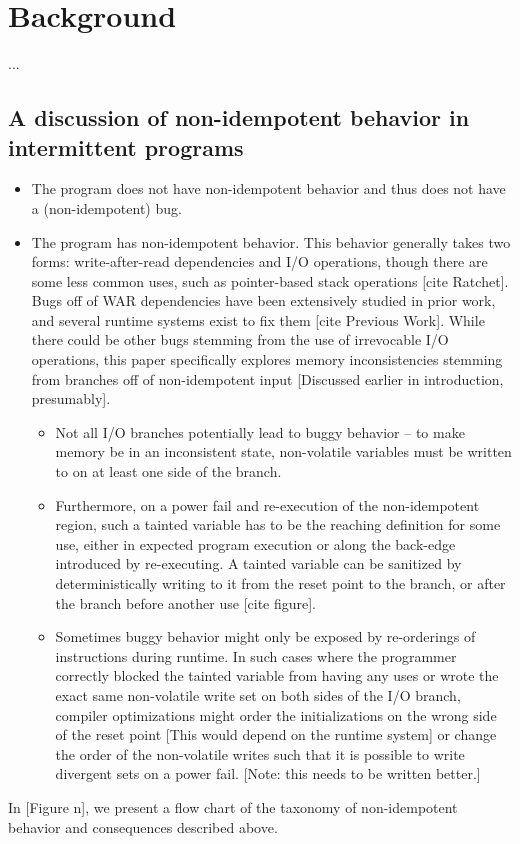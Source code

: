 \section{Background}

...

\subsection{A discussion of non-idempotent behavior in intermittent programs}
\begin{itemize}
\item{The program does not have non-idempotent behavior and thus does not have a (non-idempotent) bug.}
\item{ The program has non-idempotent behavior. This behavior generally takes two forms: write-after-read dependencies and I/O operations, though there are some less common uses, such as pointer-based stack operations [cite Ratchet].  Bugs off of WAR dependencies have been extensively studied in prior work, and several runtime systems exist to fix them [cite Previous Work]. While there could be other bugs stemming from the use of irrevocable I/O operations, this paper specifically explores memory inconsistencies stemming from branches off of non-idempotent input [Discussed earlier in introduction, presumably].} 
\begin{itemize}
		\item{Not all I/O branches potentially lead to buggy behavior -- to make memory be in an inconsistent state, non-volatile variables must be written to on at least one side of the branch.}
		\item{Furthermore, on a power fail and re-execution of the non-idempotent region, such a tainted variable has to be the reaching definition for some use, either in expected program execution or along the back-edge introduced by re-executing. A tainted variable can be sanitized by deterministically writing to it from the reset point to the branch, or after the branch before another use [cite figure].} 
		\item{Sometimes buggy behavior might only be exposed by re-orderings of instructions during runtime. In such cases where the programmer correctly blocked the tainted variable from having any uses or wrote the exact same non-volatile write set on both sides of the I/O branch, compiler optimizations might order the initializations on the wrong side of the reset point [This would depend on the runtime system] or change the order of the non-volatile writes such that it is possible to write divergent sets on a power fail. [Note: this needs to be written better.]} 
\end{itemize}
\end{itemize}		
In [Figure n], we present a flow chart of the taxonomy of non-idempotent behavior and consequences described above. 
